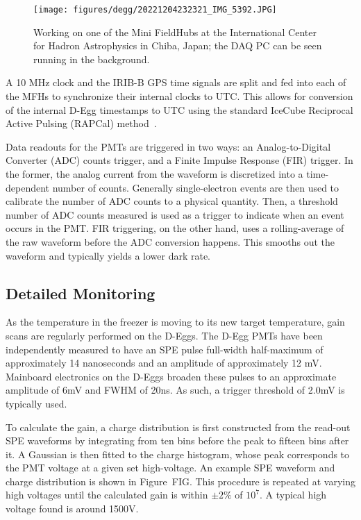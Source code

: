 \documentclass[main.tex]{subfiles}
\begin{document}
\begin{figure}
    \centering
    \texttt{[image: figures/degg/20221204232321\_IMG\_5392.JPG]}
    \caption{Working on one of the Mini FieldHubs at the International Center for Hadron Astrophysics in Chiba, Japan; the DAQ PC can be seen running in the background.}\label{fig:degg_fat_pc}
\end{figure}

A 10 MHz clock and the IRIB-B GPS time signals are split and fed into each of the MFHs to synchronize their internal clocks to UTC.
This allows for conversion of the internal D-Egg timestamps to UTC using the standard IceCube Reciprocal Active Pulsing (RAPCal) method~\cite{ABBASI2009294}.

Data readouts for the PMTs are triggered in two ways: an Analog-to-Digital Converter (ADC) counts trigger, and a Finite Impulse Response (FIR) trigger. 
In the former, the analog current from the waveform is discretized into a time-dependent number of counts. 
Generally single-electron events are then used to calibrate the number of ADC counts to a physical quantity.
Then, a threshold number of ADC counts measured is used as a trigger to indicate when an event occurs in the PMT. 
FIR triggering, on the other hand, uses a rolling-average of the raw waveform before the ADC conversion happens. 
This smooths out the waveform and typically yields a lower dark rate.


\subsection{Detailed Monitoring}

As the temperature in the freezer is moving to its new target temperature, gain scans are regularly performed on the D-Eggs. 
The D-Egg PMTs have been independently measured to have an SPE pulse full-width half-maximum of approximately 14 nanoseconds and an amplitude of approximately 12 mV. 
Mainboard electronics on the D-Eggs broaden these pulses to an approximate amplitude of 6mV and FWHM of 20ns. 
As such, a trigger threshold of 2.0mV is typically used.

To calculate the gain, a charge distribution is first constructed from the read-out SPE waveforms by integrating from ten bins before the peak to fifteen bins after it.
A Gaussian is then fitted to the charge histogram, whose peak corresponds to the PMT voltage at a given set high-voltage. An example SPE waveform and charge distribution is shown in Figure~FIG.
This procedure is repeated at varying high voltages until the calculated gain is within $\pm 2\%$ of $10^{7}$.
A typical high voltage found is around 1500V. 
\end{document}
